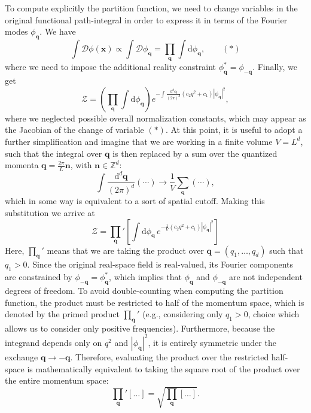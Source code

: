 To compute explicitly the partition function, we need to change variables in the original functional path-integral in order to express it in terms of the Fourier modes \( \phi_{\mathbf{q}} \). We have
\[
    \int \mathcal{D}\phi(\mathbf{x}) \propto \int \mathcal{D}\phi_{\mathbf{q}} = \prod_{\mathbf{q}} \int \mathrm{d}\phi_{\mathbf{q}}, \qquad (*)
\]
where we need to impose the additional reality constraint \( \phi_{\mathbf{q}}^* = \phi_{-\mathbf{q}} \). Finally, we get
\[
    \mathcal{Z} = \left( \prod_{\mathbf{q}} \int \mathrm{d}\phi_{\mathbf{q}} \right) e^{- \int \frac{\mathrm{d}^d \mathbf{q}}{(2\pi)^d} (c_2 q^2 + c_1) |\phi_{\mathbf{q}}|^2},
\]
where we neglected possible overall normalization constants, which may appear as the Jacobian of the change of variable \((*)\). At this point, it is useful to adopt a further simplification and imagine that we are working in a finite volume \( V = L^d \), such that the integral over \( \mathbf{q} \) is then replaced by a sum over the quantized momenta \( \mathbf{q} = \frac{2\pi}{L} \mathbf{n} \), with \(\mathbf{n} \in \mathbb{Z}^d \):
\[
    \int \frac{\mathrm{d}^d \mathbf{q}}{(2\pi)^d} (\cdots) \longrightarrow \frac{1}{V} \sum_{\mathbf{q}} (\cdots),
\]
which in some way is equivalent to a sort of spatial cutoff. Making this substitution we arrive at
\[
    \mathcal{Z} = \prod_{\mathbf{q}}' \left[ \int \mathrm{d}\phi_{\mathbf{q}} \, e^{- \frac{1}{V} (c_2 q^2 + c_1) |\phi_{\mathbf{q}}|^2} \right]
\]
Here, \( \prod\limits_{\mathbf{q}}' \) means that we are taking the product over \( \mathbf{q} = (q_1, \dots, q_d) \) such that \( q_1 > 0 \).
Since the original real-space field is real-valued, its Fourier components are constrained by \(\phi_{-\mathbf{q}} = \phi_{\mathbf{q}}^*\), which implies that \(\phi_{\mathbf{q}}\) and \(\phi_{-\mathbf{q}}\) are not independent degrees of freedom. To avoid double-counting when computing the partition function, the product must be restricted to half of the momentum space, which is denoted by the primed product \(\prod_{\mathbf{q}}'\) (e.g., considering only \(q_1 > 0\), choice which allows us to consider only positive frequencies). Furthermore, because the integrand depends only on \(q^2\) and \(|\phi_{\mathbf{q}}|^2\), it is entirely symmetric under the exchange \(\mathbf{q} \to -\mathbf{q}\). Therefore, evaluating the product over the restricted half-space is mathematically equivalent to taking the square root of the product over the entire momentum space:
\[
    \prod_{\mathbf{q}}' \left[ \dots \right] = \sqrt{\prod_{\mathbf{q}} \left[ \dots \right]}.
\]

